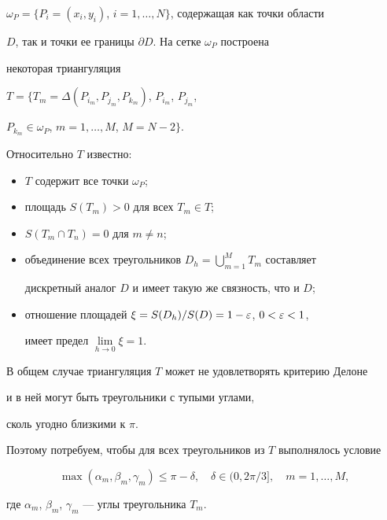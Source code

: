 $\omega_P = \{P_i=(x_i,y_i)$, $i=1,\dotsc,N\}$, содержащая как точки области


$D$, так и точки ее границы $\partial D$. На сетке $\omega_P$ построена


некоторая триангуляция 


$T=\{T_m=\Delta(P_{i_m},P_{j_m},P_{k_m})$, $P_{i_m}$, $P_{j_m}$,


$P_{k_m}\in \omega_P$, $m=1,\dotsc,M$, $M=N-2\}$.


Относительно $T$ известно:


\begin{itemize}


\item[1)] $T$ содержит все точки  $\omega_P$;


\item[2)] площадь $S(T_m)>0$ для всех $T_m\in T$;


\item[3)] ${S(T_m \cap T_n)=0}$ для $m\ne n$;


\item[4)] объединение всех треугольников $D_h=


\bigcup\limits_{m=1}^{M} T_m$ составляет


дискретный аналог $D$ и имеет такую же связность, что и $D$;


\item[5)] отношение площадей $\xi=S(D_h)/S(D)=1-\varepsilon$, $0<\varepsilon<1$,


имеет предел $\lim\limits_{h\to0} \xi=1$.


\end{itemize}





В общем случае триангуляция $T$ может не удовлетворять критерию Делоне


и в ней могут быть треугольники с тупыми углами,


сколь угодно близкими к $\pi$.


Поэтому потребуем, чтобы для всех треугольников из $T$ выполнялось условие


$$


\max(\alpha_m, \beta_m, \gamma_m) \le \pi-\delta, \quad


\delta \in (0,2\pi/3], \quad m=1,\dotsc,M,


$$


где $\alpha_m$, $\beta_m$, $\gamma_m$ --- углы треугольника $T_m$.






